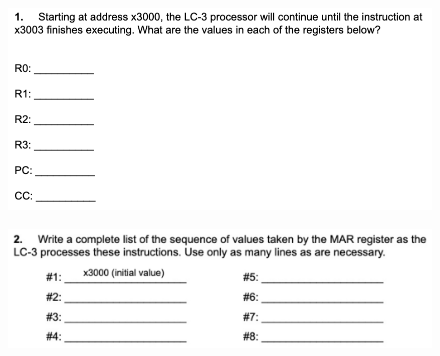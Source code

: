 \documentclass{article}
\begin{document}
\begin{figure}[!h]
    \centering
    \includegraphics[width=1\textwidth]{figures/lc3p1p3.png}
\end{figure}


\begin{figure}[!h]
    \centering
    \includegraphics[width=1\textwidth]{figures/lc3_q1p2.jpg}
\end{figure}

\newpage
\end{document}
